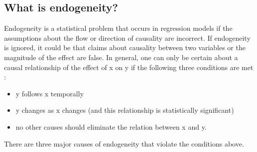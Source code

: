 \documentclass[12pt,english]{article}
\begin{document}
\begin{appendix}
\section{What is endogeneity?}
Endogeneity is a statistical problem that occurs in regression models if the assumptions about the flow or direction of causality are incorrect. If endogeneity is ignored, it could be that claims about causality between two variables or the magnitude of the effect are false. In general, one can only be certain about a causal relationship of the effect of x on y if the following three conditions are met \parencite{Antonakis2012}:

\begin{itemize}
\item	y follows x temporally
\item	y changes as x changes (and this relationship is statistically significant)
\item	no other causes should eliminate the relation between x and y.
\end{itemize}

There are three major causes of endogeneity that violate the conditions above.

\begin{enumerate}


\end{enumerate}
\end{appendix}
\end{document}
